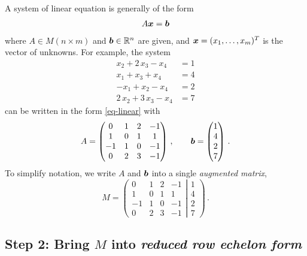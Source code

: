 A system of linear equation is generally of the form
\begin{align}
  A \boldsymbol{x} = \boldsymbol{b} \label{eq-linear}
\end{align}
where $A \in M(n \times m)$ and $\boldsymbol{b} \in \mathbb{R}^n$ are given, and $\boldsymbol{x}=(x_1,\dots, x_m)^T$ is the vector of unknowns.  For example, the system
\begin{align*}
  x_2 + 2 \, x_3 - x_4 & = 1 \\
  x_1 + x_3 + x_4 & = 4 \\
  -x_1 + x_2 - x_4 & = 2 \\
  2 \, x_2 + 3 \, x_3 - x_4 & = 7
\end{align*}
can be written in the form \ref{eq-linear} with
\begin{equation*}
  A = 
  \begin{pmatrix}
  0 & 1 & 2 & -1 \\
  1 & 0 & 1 & 1 \\
  -1 & 1 & 0 & -1 \\
  0 & 2 & 3 & -1
  \end{pmatrix} \,,
  \qquad \boldsymbol{b} =
  \begin{pmatrix}
  1 \\ 4 \\ 2 \\ 7 
  \end{pmatrix} \,.
\end{equation*}
To simplify notation, we write $A$ and $\boldsymbol{b} $ into a single
\emph{augmented matrix},
\begin{equation}
  M = \left(
  \begin{matrix}
  0 & 1 & 2 & -1 \\
  1 & 0 & 1 & 1 \\
  -1 & 1 & 0 & -1 \\
  0 & 2 & 3 & -1
  \end{matrix}
  \right.\left|\left.
  \begin{matrix}
  1 \\ 4 \\ 2 \\ 7 
  \end{matrix}
  \right)\right. \,.
  \label{e.m}
\end{equation}

\subsection*{Step 2: Bring $M$ into \emph{reduced row echelon form}}

